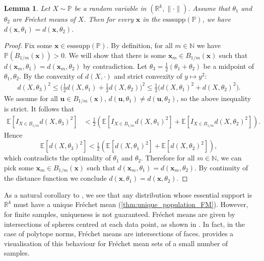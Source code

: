 \documentclass[10pt]{article}
\newtheorem{lemma}[theorem]{Lemma}
\theoremstyle{definition}
\theoremstyle{remark}
\newcommand{\R}{\mathbb{R}}
\newcommand{\N}{\mathbb{N}}
\newcommand{\esssupp}{\mathrm{esssupp}}
\newcommand{\E}{\mathbb{E}}
\renewcommand{\vec}[1]{\mathbf{#1}}
\newcommand{\mb}[1]{\mathbb #1}
\begin{document}
	\begin{lemma}
		\label{lemma:FM_dists}
		Let $X \sim \mathbb P$ be a random variable in $(\R^k, \| \cdot \|)$. Assume that $\theta_1$ and $\theta_2$ are Fr\'echet means of $X$. Then for every $\vec x$ in the  $\esssupp(\mathbb P)$, we have $d(\vec x, \theta_1) = d(\vec x, \theta_2)$. 
	\end{lemma}
	\begin{proof} 
		Fix some $\vec x \in \esssupp(\mb P)$. By definition, for all $m \in \N$ we have $\mb P(B_{1/m}(\vec x)) > 0$. We will show that there is some $\vec x_m \in B_{1/m}(\vec x)$ such that $d(\vec x_m,\theta_1) = d(\vec x_m, \theta_2)$ by contradiction. Let $\theta_3 = \tfrac{1}{2}(\theta_1 + \theta_2)$ be a midpoint of $\theta_1, \theta_2$. By the convexity of $d(X,\cdot)$ and strict convexity of $y \mapsto y^2$:
		\begin{align*}
			d(X,\theta_3)^2 \leq \big(\tfrac{1}{2}d(X,\theta_1) + \tfrac{1}{2}d(X,\theta_2)\big)^2 \leq \tfrac{1}{2}\big( d(X,\theta_1)^2 + d(X,\theta_2)^2\big).
		\end{align*}
		We assume for all $\vec u \in B_{1/m}(\vec x)$, $d(\vec u,\theta_1) \neq d(\vec u, \theta_2)$, so the above inequality is strict. It follows that
		\begin{align*}
			\E \left[I_{X \in B_{1/m}}d(X,\theta_3)^2\right] &< \tfrac{1}{2}\left(\E\left[I_{X \in B_{1/m}}d(X,\theta_1)^2\right] + \E \left[I_{X \in B_{1/m}}d(X,\theta_2)^2\right]\right).
		\end{align*}
		Hence
		\[
		\E \left[d(X,\theta_3)^2\right] < \tfrac{1}{2}\left(\E\left[d(X,\theta_1)^2\right] + \E \left[d(X,\theta_2)^2\right]\right),
		\]
		which contradicts the optimality of $\theta_1$ and $\theta_2$. Therefore for all $m \in \N$, we can pick some $\vec x_m \in B_{1/m}(\vec x)$ such that $d(\vec x_m,\theta_1) = d(\vec x_m,\theta_2)$. By continuity of the distance function we conclude $d(\vec x,\theta_1) = d(\vec x,\theta_2)$.
	\end{proof}
	
	As a natural corollary to , we see that any distribution whose essential support is $\R^k$ must have a unique Fr\'echet mean (\cref{thm:unique_population_FM}). However, for finite samples, uniqueness is not guaranteed. Fr\'echet means are given by intersections of spheres centred at each data point, as shown in . In fact, in the case of polytope norms, Fr\'echet means are intersections of faces.  provides a visualisation of this behaviour for Fr\'echet mean sets of a small number of samples. 
	
\end{document}
